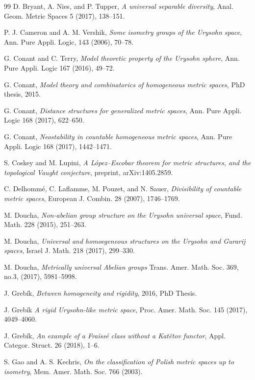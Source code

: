 \documentclass[leqno, 12pt]{jsarticle}
\begin{document}
\begin{thebibliography}{99}
D. Bryant, A. Nies, and 
P. Tupper, 
\textit{A universal separable diversity}, 
Anal. Geom. Metric Spaces 5 (2017), 
138--151. 


P. J. Cameron and A. M. Vershik, 
\textit{Some isometry groups of the Urysohn space}, 
Ann. Pure Appli. Logic, 143 (2006), 
70--78. 

G. Conant and 
C. Terry, 
\textit{Model theoretic property of the Urysohn sphere}, 
Ann. Pure Appli. Logic 167 (2016), 49--72. 

G. Conant, 
\textit{Model theory and combinatorics of homogeneous metric spaces}, 
PhD thesis, 2015. 


G. Conant, 
\textit{Distance structures for generalized metric spaces}, 
Ann. Pure Appli. Logic 168 (2017), 622--650. 


G. Conant, 
\textit{Neostability in countable homogeneous metric spaces}, 
Ann. Pure Appli. Logic 168 (2017), 1442--1471. 


S. Coskey and M. Lupini, 
\textit{A L\'{o}pez--Escobar theorem for metric structures, and the topological Vaught conjecture}, 
preprint, arXiv:1405.2859. 

C. Delhomm\'e, C. Laflamme, 
M. Pouzet, and 
N. Sauer, 
\textit{Divisibility of countable metric spaces}, 
European J. Combin. 28 (2007), 1746--1769. 


M. Doucha, 
\textit{Non-abelian group structure on the Urysohn universal space}, 
Fund.  Math. 228 (2015), 251--263. 


M. Doucha, 
\textit{Universal and homoegeneous structures on the Urysohn and Gurarij spaces}, 
Israel J. Math. 218 (2017), 299--330. 

M. Doucha, 
\textit{Metrically universal Abelian groups}
Trans. Amer. Math. Soc. 
369, no.3,   (2017), 5981--5998. 

J. Greb\'{i}k, 
\textit{Between homogeneity and rigidity}, 
2016, PhD Thesis. 


J. Greb\'{i}k
\textit{A rigid Urysohn-like metric space}, 
Proc. Amer. Math. Soc. 
145 (2017), 4049--4060. 

J. Greb\'{i}k, 
\textit{An example of a Fra\"{i}ss\'{e} class without a Kat\v{e}tov functor}, 
Appl. Categor. Struct. 26 (2018), 1--6. 

S. Gao and A. S. Kechris, 
\textit{On the classification of Polish metric spaces up to isometry}, 
Mem. Amer. Math. Soc. 766 (2003). 


\end{thebibliography}
\end{document}
